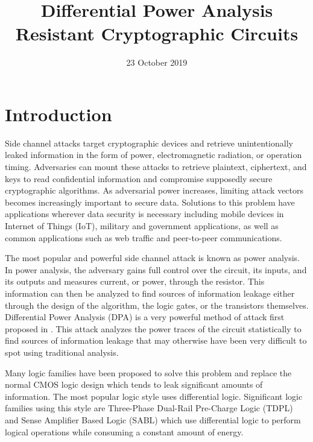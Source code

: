 \documentclass[conference, 12pt]{IEEEtran}
\begin{document}
	\title{Differential Power Analysis Resistant Cryptographic Circuits}
	\author{
	}
	\date{23 October 2019}

	\maketitle
	
	\section{Introduction}
		Side channel attacks target cryptographic devices and retrieve unintentionally leaked information in the form of power, electromagnetic radiation, or operation timing. Adversaries can mount these attacks to retrieve plaintext, ciphertext, and keys to read confidential information and compromise supposedly secure cryptographic algorithms. As adversarial power increases, limiting attack vectors becomes increasingly important to secure data. Solutions to this problem have applications wherever data security is necessary including mobile devices in Internet of Things (IoT), military and government applications, as well as common applications such as web traffic and peer-to-peer communications.

		The most popular and powerful side channel attack is known as power analysis. In power analysis, the adversary gains full control over the circuit, its inputs, and its outputs and measures current, or power, through the resistor. This information can then be analyzed to find sources of information leakage either through the design of the algorithm, the logic gates, or the transistors themselves. Differential Power Analysis (DPA) is a very powerful method of attack first proposed in \cite{b7}. This attack analyzes the power traces of the circuit statistically to find sources of information leakage that may otherwise have been very difficult to spot using traditional analysis. 

		Many logic families have been proposed to solve this problem and replace the normal CMOS logic design which tends to leak significant amounts of information. The most popular logic style uses differential logic. Significant logic families using this style are Three-Phase Dual-Rail Pre-Charge Logic (TDPL) and Sense Amplifier Based Logic (SABL) which use differential logic to perform logical operations while consuming a constant amount of energy. 
\end{document}
